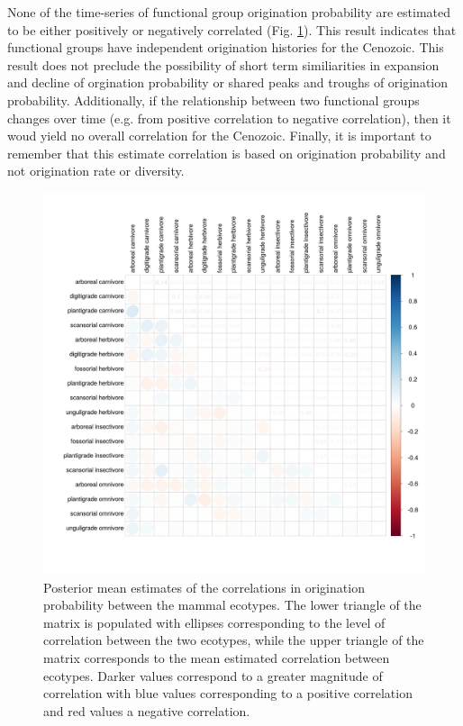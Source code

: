 \documentclass[12pt,letterpaper]{article}
\begin{document}
None of the time-series of functional group origination probability are estimated to be either positively or negatively correlated (Fig. \ref{fig:origin_corr}). This result indicates that functional groups have independent origination histories for the Cenozoic. This result does not preclude the possibility of short term similiarities in expansion and decline of orgination probability or shared peaks and troughs of origination probability. Additionally, if the relationship between two functional groups changes over time (e.g. from positive correlation to negative correlation), then it woud yield no overall correlation for the Cenozoic. Finally, it is important to remember that this estimate correlation is based on origination probability and not origination rate or diversity.
\begin{figure}[ht]
  \centering
  \includegraphics[width=\textwidth,height=\textheight,keepaspectratio=true]{figure/origination_correlation}
  \caption[Estimated correlations in origination probability between ecotypes]{Posterior mean estimates of the correlations in origination probability between the mammal ecotypes. The lower triangle of the matrix is populated with ellipses corresponding to the level of correlation between the two ecotypes, while the upper triangle of the matrix corresponds to the mean estimated correlation between ecotypes. Darker values correspond to a greater magnitude of correlation with blue values corresponding to a positive correlation and red values a negative correlation.}
  \label{fig:origin_corr}
\end{figure}
\end{document}
